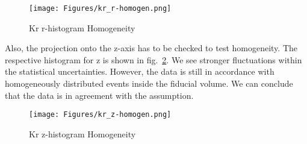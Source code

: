 \begin{figure}
\centering
\texttt{[image: Figures/kr\_r-homogen.png]}  %
\caption[Kr r-histogram Homogeneity]{
        Kr r-histogram Homogeneity
    }
\label{fig:r-hist-homogen}
\end{figure}

Also, the projection onto the z-axis has to be checked to test homogeneity.
The respective histogram for z is shown in fig.~\ref{fig:z-hist-homogen}.
We see stronger fluctuations within the statistical uncertainties.
However, the data is still in accordance with homogeneously distributed events inside the fiducial volume.
We can conclude that the data is in agreement with the assumption.

\begin{figure}
\centering
\texttt{[image: Figures/kr\_z-homogen.png]}  %
\caption[Kr z-histogram Homogeneity]{
    Kr z-histogram Homogeneity
    }
\label{fig:z-hist-homogen}
\end{figure}




